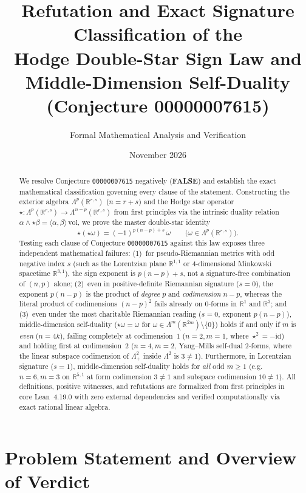 \documentclass[11pt]{article}
\title{\textbf{Refutation and Exact Signature Classification of the\\
Hodge Double-Star Sign Law and Middle-Dimension Self-Duality\\
(Conjecture 00000007615)}}
\author{Formal Mathematical Analysis and Verification}
\date{November 2026}
\theoremstyle{definition}
\newcommand{\R}{\mathbb{R}}
\newcommand{\vol}{\mathrm{vol}}
\newcommand{\id}{\mathrm{id}}
\begin{document}
\maketitle

\begin{abstract}
We resolve Conjecture \texttt{00000007615} negatively (\textbf{FALSE}) and establish the exact mathematical classification governing every clause of the statement. Constructing the exterior algebra $\Lambda^p(\R^{r,s})$ ($n = r + s$) and the Hodge star operator $\star : \Lambda^p(\R^{r,s}) \to \Lambda^{n-p}(\R^{r,s})$ from first principles via the intrinsic duality relation $\alpha \wedge \star\beta = \langle \alpha, \beta \rangle\,\vol$, we prove the master double-star identity
\[
  \star(\star\omega) = (-1)^{p(n-p)+s}\,\omega \qquad \bigl(\omega \in \Lambda^p(\R^{r,s})\bigr).
\]
Testing each clause of Conjecture \texttt{00000007615} against this law exposes three independent mathematical failures:
(1)~for pseudo-Riemannian metrics with odd negative index $s$ (such as the Lorentzian plane $\R^{1,1}$ or $4$-dimensional Minkowski spacetime $\R^{3,1}$), the sign exponent is $p(n-p)+s$, not a signature-free combination of $(n,p)$ alone;
(2)~even in positive-definite Riemannian signature ($s=0$), the exponent $p(n-p)$ is the product of \emph{degree} $p$ and \emph{codimension} $n-p$, whereas the literal product of codimensions $(n-p)^2$ fails already on $0$-forms in $\R^1$ and $\R^3$; and
(3)~even under the most charitable Riemannian reading ($s=0$, exponent $p(n-p)$), middle-dimension self-duality ($\star\omega = \omega$ for $\omega \in \Lambda^m(\R^{2m}) \setminus \{0\}$) holds if and only if $m$ is \emph{even} ($n = 4k$), failing completely at codimension~$1$ ($n=2, m=1$, where $\star^2 = -\id$) and holding first at codimension~$2$ ($n=4, m=2$, Yang--Mills self-dual $2$-forms, where the linear subspace codimension of $\Lambda^2_+$ inside $\Lambda^2$ is $3 \neq 1$). Furthermore, in Lorentzian signature ($s=1$), middle-dimension self-duality holds for \emph{all} odd $m \ge 1$ (e.g.\ $n=6, m=3$ on $\R^{5,1}$ at form codimension $3 \neq 1$ and subspace codimension $10 \neq 1$). All definitions, positive witnesses, and refutations are formalized from first principles in core Lean~4.19.0 with zero external dependencies and verified computationally via exact rational linear algebra.
\end{abstract}

\section{Problem Statement and Overview of Verdict}
\end{document}
